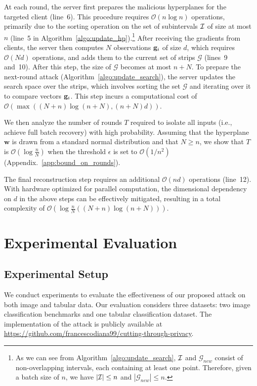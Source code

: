At each round, the server first prepares the malicious hyperplanes for the targeted client (line~6). This procedure requires $\mathcal{O}(n\log n)$ operations, primarily due to the sorting operation on the set of subintervals $\mathcal{I}$ of size at most $n$ (line~5 in Algorithm~\ref{algo:update_hp}).\footnote{As we can see from Algorithm~\ref{algo:update_search}, $\mathcal{I}$ and $\mathcal{G}_{new}$ consist of non-overlapping intervals, each containing at least one point. Therefore, given a batch size of $n$, we have $|\mathcal{I}| \leq n$ and $|\mathcal{G}_{new}| \leq n$.}
After receiving the gradients from clients, the server then computes $N$ observations $\mathbf{g}_i$ of size $d$, which requires $\mathcal{O}(Nd)$ operations, and adds them to the current set of strips $\mathcal{G}$ (lines~9 and~10). After this step, the size of $\mathcal{G}$ becomes at most $n+N$. To prepare the next-round attack (Algorithm~\ref{algo:update_search}), the server updates the search space over the strips, which involves sorting the set $\mathcal{G}$ and iterating over it to compare vectors $\mathbf{g}_i$. This step incurs a computational cost of $\mathcal{O}(\max((N+n)\log(n+N), (n+N)d))$. 

We then analyze the number of rounds $T$ required to isolate all inputs (i.e., achieve full batch recovery) with high probability. Assuming that the hyperplane $\mathbf{w}$ is drawn from a standard normal distribution and that $N \geq n$, we show that $T$ is $\mathcal{O}(\log \frac{n}{N})$ when the threshold $\epsilon$ is set to $\mathcal{O}(1/n^2)$ (Appendix.~\ref{app:bound_on_rounds}).

The final reconstruction step requires an additional $\mathcal{O}(nd)$ operations (line~12). With hardware optimized for parallel computation, the dimensional dependency on $d$ in the above steps can be effectively mitigated, resulting in a total complexity of  $\mathcal{O}\left(\log\frac{n}{N}((N+n)\log(n+N))\right)$.

\section{Experimental Evaluation}\label{sec:ctp_experiments}
\subsection{Experimental Setup}

We conduct experiments to evaluate the effectiveness of our proposed attack on both image and tabular data. Our evaluation considers three datasets: two image classification benchmarks and one tabular classification dataset. The implementation of the attack is publicly available at \url{https://github.com/francescodiana99/cutting-through-privacy}.

